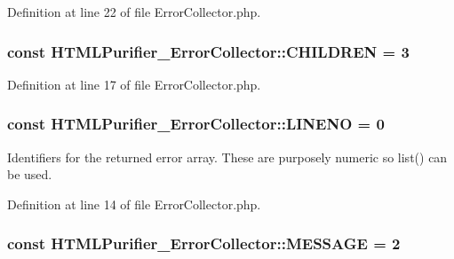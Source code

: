 Definition at line 22 of file Error\+Collector.\+php.

\hypertarget{classHTMLPurifier__ErrorCollector_a087e11859dcaab98d121f32ef279517d}{
\subsubsection[{C\+H\+I\+L\+D\+R\+E\+N}]{\setlength{\rightskip}{0pt plus 5cm}const H\+T\+M\+L\+Purifier\+\_\+\+Error\+Collector\+::\+C\+H\+I\+L\+D\+R\+E\+N = 3}}\label{classHTMLPurifier__ErrorCollector_a087e11859dcaab98d121f32ef279517d}


Definition at line 17 of file Error\+Collector.\+php.

\hypertarget{classHTMLPurifier__ErrorCollector_a9d60433c835cfa6d3a6f104387d91a38}{
\subsubsection[{L\+I\+N\+E\+N\+O}]{\setlength{\rightskip}{0pt plus 5cm}const H\+T\+M\+L\+Purifier\+\_\+\+Error\+Collector\+::\+L\+I\+N\+E\+N\+O = 0}}\label{classHTMLPurifier__ErrorCollector_a9d60433c835cfa6d3a6f104387d91a38}
Identifiers for the returned error array. These are purposely numeric so list() can be used. 

Definition at line 14 of file Error\+Collector.\+php.

\hypertarget{classHTMLPurifier__ErrorCollector_a184c6bcec37b4fafbbeff5121da7a5c8}{
\subsubsection[{M\+E\+S\+S\+A\+G\+E}]{\setlength{\rightskip}{0pt plus 5cm}const H\+T\+M\+L\+Purifier\+\_\+\+Error\+Collector\+::\+M\+E\+S\+S\+A\+G\+E = 2}}\label{classHTMLPurifier__ErrorCollector_a184c6bcec37b4fafbbeff5121da7a5c8}


